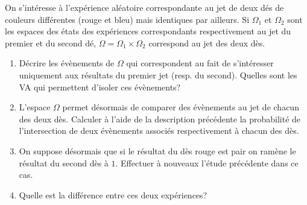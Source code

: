\documentclass[11pt, a4paper]{article}
\begin{document}
\begin{question}
  On s'intéresse à l'expérience aléatoire correspondante au jet de
  deux dés de couleurs différentes (rouge et bleu) mais identiques par
  ailleurs. Si $\Omega_1$ et $\Omega_2$ sont les espaces des états des
  expériences correspondants respectivement au jet du premier et du
  second dé, $\Omega = \Omega_1\times \Omega_2$ correspond au jet des
  deux dès.
  \begin{enumerate}
  \item Décrire les évènements de $\Omega$ qui correspondent au fait
    de s'intéresser uniquement aux résultats du premier jet (resp. du
    second). Quelles sont les VA qui permettent d'isoler ces
    évènements?
  \item L'espace $\Omega$ permet désormais de comparer des évènements
    au jet de chacun des deux dès. Calculer à l'aide de la description
    précédente la probabilité de l'intersection de deux évènements
    associés respectivement à chacun des dès.
  \item On suppose désormais que si le résultat du dès rouge est pair
    on ramène le résultat du second dès à $1$. Effectuer à nouveaux
    l'étude précédente dans ce cas.
  \item Quelle est la différence entre ces deux expériences?
  \end{enumerate}
\end{question}
\end{document}
